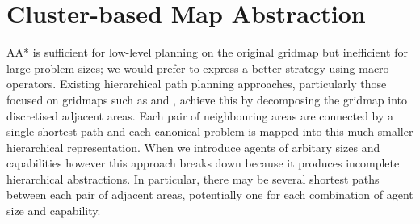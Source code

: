 \section{Cluster-based Map Abstraction}
\label{aha:mapabstraction}
AA* is sufficient for low-level planning on the original gridmap but inefficient for large problem sizes; we would prefer to express a better strategy using macro-operators.
Existing hierarchical path planning approaches, particularly those focused on gridmaps such as \cite{botea04} and \cite{sturtevant05}, achieve this by decomposing the gridmap into discretised adjacent areas. 
Each pair of neighbouring areas are connected by a single shortest path and each canonical problem is mapped into this much smaller hierarchical representation.
When we introduce agents of arbitary sizes and capabilities however this approach breaks down because it produces incomplete hierarchical abstractions. 
In particular, there may be several shortest paths between each pair of adjacent areas, potentially one for each combination of agent size and capability.
